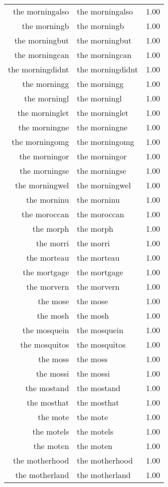 \begin{table}[ht]
\begin{tabular}{rlr}
  the morningalso & the morningalso & 1.00 \\ 
  the morningb & the morningb & 1.00 \\ 
  the morningbut & the morningbut & 1.00 \\ 
  the morningcan & the morningcan & 1.00 \\ 
  the morningdidnt & the morningdidnt & 1.00 \\ 
  the morningg & the morningg & 1.00 \\ 
  the morningl & the morningl & 1.00 \\ 
  the morninglet & the morninglet & 1.00 \\ 
  the morningne & the morningne & 1.00 \\ 
  the morningomg & the morningomg & 1.00 \\ 
  the morningor & the morningor & 1.00 \\ 
  the morningse & the morningse & 1.00 \\ 
  the morningwel & the morningwel & 1.00 \\ 
  the morninu & the morninu & 1.00 \\ 
  the moroccan & the moroccan & 1.00 \\ 
  the morph & the morph & 1.00 \\ 
  the morri & the morri & 1.00 \\ 
  the morteau & the morteau & 1.00 \\ 
  the mortgage & the mortgage & 1.00 \\ 
  the morvern & the morvern & 1.00 \\ 
  the mose & the mose & 1.00 \\ 
  the mosh & the mosh & 1.00 \\ 
  the mosquein & the mosquein & 1.00 \\ 
  the mosquitos & the mosquitos & 1.00 \\ 
  the moss & the moss & 1.00 \\ 
  the mossi & the mossi & 1.00 \\ 
  the mostand & the mostand & 1.00 \\ 
  the mosthat & the mosthat & 1.00 \\ 
  the mote & the mote & 1.00 \\ 
  the motels & the motels & 1.00 \\ 
  the moten & the moten & 1.00 \\ 
  the motherhood & the motherhood & 1.00 \\ 
  the motherland & the motherland & 1.00 \\ 

\end{tabular}
\end{table}
